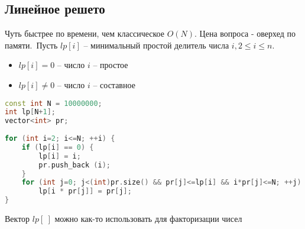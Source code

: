 \subsection{Линейное решето}
Чуть быстрее по времени, чем классическое $O (N)$. Цена вопроса - оверхед по памяти.\
Пусть $lp[i]$ -- минимальный простой делитель числа $i, 2\leq i\leq n$. \
\begin{itemize}
\item $lp[i] = 0$ -- число $i$ -- простое
\item $lp[i] \neq 0$ -- число $i$ -- составное
\end{itemize}
\begin{lstlisting}[language=C++]
const int N = 10000000;
int lp[N+1];
vector<int> pr;
 
for (int i=2; i<=N; ++i) {
	if (lp[i] == 0) {
		lp[i] = i;
		pr.push_back (i);
	}
	for (int j=0; j<(int)pr.size() && pr[j]<=lp[i] && i*pr[j]<=N; ++j)
		lp[i * pr[j]] = pr[j];
}
\end{lstlisting}
Вектор $lp[\ ]$ можно как-то использовать для факторизации чисел